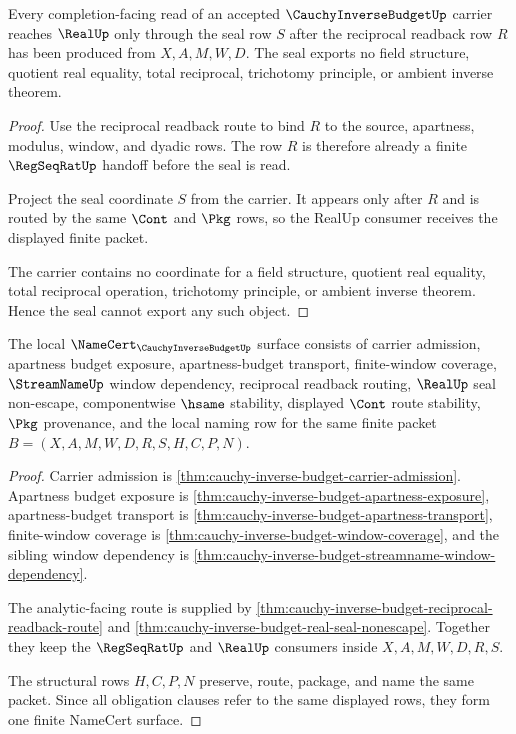 \begin{theorem}
\label{thm:cauchy-inverse-budget-real-seal-nonescape}
Every completion-facing read of an accepted $\CauchyInverseBudgetUp$ carrier reaches $\RealUp$ only through the seal row $S$ after the reciprocal readback row $R$ has been produced from $X,A,M,W,D$. The seal exports no field structure, quotient real equality, total reciprocal, trichotomy principle, or ambient inverse theorem.
\end{theorem}
\begin{proof}
Use the reciprocal readback route to bind $R$ to the source, apartness, modulus, window, and dyadic rows. The row $R$ is therefore already a finite $\RegSeqRatUp$ handoff before the seal is read.

Project the seal coordinate $S$ from the carrier. It appears only after $R$ and is routed by the same $\Cont$ and $\Pkg$ rows, so the RealUp consumer receives the displayed finite packet.

The carrier contains no coordinate for a field structure, quotient real equality, total reciprocal operation, trichotomy principle, or ambient inverse theorem. Hence the seal cannot export any such object.
\end{proof}

\begin{theorem}
\label{thm:cauchy-inverse-budget-namecert-obligations}
The local $\NameCert_{\CauchyInverseBudgetUp}$ surface consists of carrier admission, apartness budget exposure, apartness-budget transport, finite-window coverage, $\StreamNameUp$ window dependency, reciprocal readback routing, $\RealUp$ seal non-escape, componentwise $\hsame$ stability, displayed $\Cont$ route stability, $\Pkg$ provenance, and the local naming row for the same finite packet $B=(X,A,M,W,D,R,S,H,C,P,N)$.
\end{theorem}
\begin{proof}
Carrier admission is \autoref{thm:cauchy-inverse-budget-carrier-admission}. Apartness budget exposure is \autoref{thm:cauchy-inverse-budget-apartness-exposure}, apartness-budget transport is \autoref{thm:cauchy-inverse-budget-apartness-transport}, finite-window coverage is \autoref{thm:cauchy-inverse-budget-window-coverage}, and the sibling window dependency is \autoref{thm:cauchy-inverse-budget-streamname-window-dependency}.

The analytic-facing route is supplied by \autoref{thm:cauchy-inverse-budget-reciprocal-readback-route} and \autoref{thm:cauchy-inverse-budget-real-seal-nonescape}. Together they keep the $\RegSeqRatUp$ and $\RealUp$ consumers inside $X,A,M,W,D,R,S$.

The structural rows $H,C,P,N$ preserve, route, package, and name the same packet. Since all obligation clauses refer to the same displayed rows, they form one finite NameCert surface.
\end{proof}


